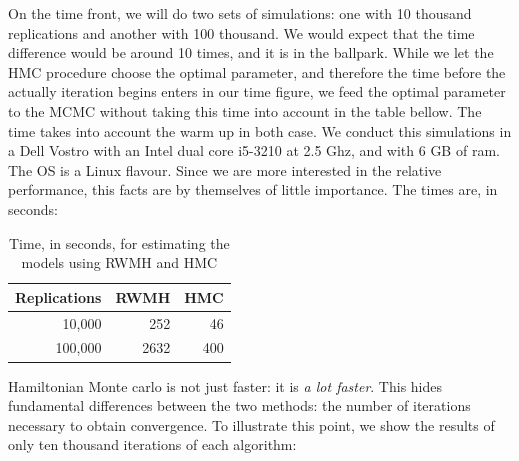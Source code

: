 \documentclass[12pt,a4paper]{article}
\begin{document}
On the time front, we will do two sets of simulations: one with 10 thousand replications and another with 100 thousand. We would expect that the time difference would be around 10 times, and it is in the ballpark. While we let the HMC procedure choose the optimal parameter, and therefore the time before the actually iteration begins enters in our time figure, we feed the optimal parameter to the MCMC without taking this time into account in the table bellow. The time takes into account the warm up in both case. We conduct this simulations in a Dell Vostro with an Intel dual core i5-3210 at 2.5 Ghz, and with 6 GB of ram. The OS is a Linux flavour. Since we are more interested in the relative performance, this facts are by themselves of little importance. The times are, in seconds:

\begin{table}[h]
	\centering
	\caption{Time, in seconds, for estimating the models using RWMH and HMC}	
	\begin{tabular}{r | r | r}
		Replications & RWMH & HMC \\
		\hline
		10,000 & 252 & 46 \\
		100,000 & 2632 & 400 \\
	\end{tabular}
\end{table}

Hamiltonian Monte carlo is not just faster: it is \emph{a lot faster}. This hides fundamental differences between the two methods: the number of iterations necessary to obtain convergence. To illustrate this point, we show the results of only ten thousand iterations of each algorithm:
\end{document}
